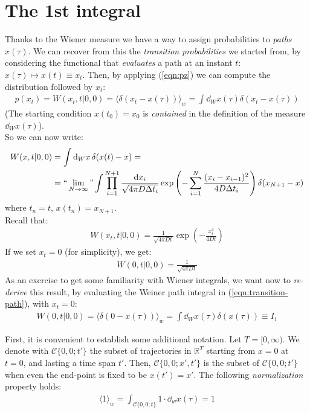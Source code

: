 \documentclass[../template.tex]{subfiles}
\begin{document}
\section{The 1st integral} %
Thanks to the Wiener measure we have a way to assign probabilities to \textit{paths} $x(\tau)$. We can recover from this the \textit{transition probabilities} we started from, by considering the functional that \textit{evaluates} a path at an instant $t$: $x(\tau) \mapsto x(t) \equiv x_t$. Then, by applying (\ref{eqn:pz}) we can compute the distribution followed by $x_t$: 
\begin{align}
    p(x_t) = W(x_t,t|0,0) = \langle \delta(x_t-x(\tau)) \rangle_w = \int \dd{_Wx(\tau)} \delta(x_t - x(\tau))
    \label{eqn:transition-path}
\end{align} 
(The starting condition $x(t_0) = x_0$ is \textit{contained} in the definition of the measure $\dd{_W}x(\tau)$).\\
So we can now write:
\begin{align*}
    W(x,t|0,0) &= \int \dd{_W x} \delta(x(t)-x) =\\
    &= ``\lim_{N \to \infty}"
    \int \prod_{i=1}^{N+1} \frac{\dd{x_i}}{\sqrt{4 \pi D \Delta t_i}} \exp\left(-\sum_{i=1}^N \frac{(x_i - x_{i-1})^2}{4 D \Delta t_i} \right) \delta(x_{N+1} - x)
\end{align*}
where $t_n = t$, $x(t_n) = x_{N+1}$.\\

Recall that:
\begin{align*}
    W(x_t,t|0,0) = \frac{1}{\sqrt{4 \pi D t}} \exp \left(-\frac{x_t^2}{4 D t} \right)
\end{align*}
If we set $x_t = 0$ (for simplicity), we get:
\begin{align}
    W(0, t | 0,0) = \frac{1}{\sqrt{4 \pi D t}} 
    \label{eqn:I1res}
\end{align} 
As an exercise to get some familiarity with Wiener integrals, we want now to \textit{re-derive} this result, by evaluating the Weiner path integral in (\ref{eqn:transition-path}), with $x_t = 0$:
\begin{align}
    W(0,t|0,0) = \langle \delta(0-x(\tau)) \rangle_w = \int \dd{_Wx(\tau)} \delta(x(\tau)) \equiv I_1
    \label{eqn:I1def}
\end{align} 

First, it is convenient to establish some additional notation. Let $T = [0,\infty)$.  We denote with $\mathcal{C}\{0,0;t'\}$ the subset of trajectories in $\mathbb{R}^T$ starting from $x=0$ at $t=0$, and lasting a time span $t'$. Then, $\mathcal{C}\{0,0;x',t'\}$ is the subset of $\mathcal{C}\{0,0;t'\}$ when even the end-point is fixed to be $x(t') = x'$. The following \textit{normalization} property holds:
\begin{align*}
    \langle 1 \rangle_w = \int_{\mathcal{C}\{0,0;t\}} 1\cdot \dd{_wx(\tau)} = 1
\end{align*}        
\end{document}
